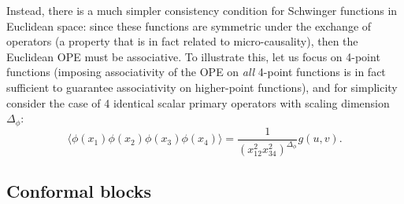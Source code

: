 \documentclass[a4paper,12pt]{article}
\numberwithin{equation}{section}
\begin{document}
Instead, there is a much simpler consistency condition for Schwinger functions in Euclidean space: since these functions are symmetric under the exchange of operators (a property that is in fact related to micro-causality), then the Euclidean OPE must be associative. To illustrate this, let us focus on 4-point functions (imposing associativity of the OPE on \emph{all} 4-point functions is in fact sufficient to guarantee associativity on higher-point functions), and for simplicity consider the case of 4 identical scalar primary operators with scaling dimension $\Delta_\phi$:
\begin{equation}
	\langle \phi(x_1) \phi(x_2) \phi(x_3) \phi(x_4) \rangle
	= \frac{1}{(x_{12}^2 x_{34}^2)^{\Delta_\phi}}
	g(u, v).
	\label{eq:4pt:repeated}
\end{equation}


\subsection{Conformal blocks}
\end{document}
